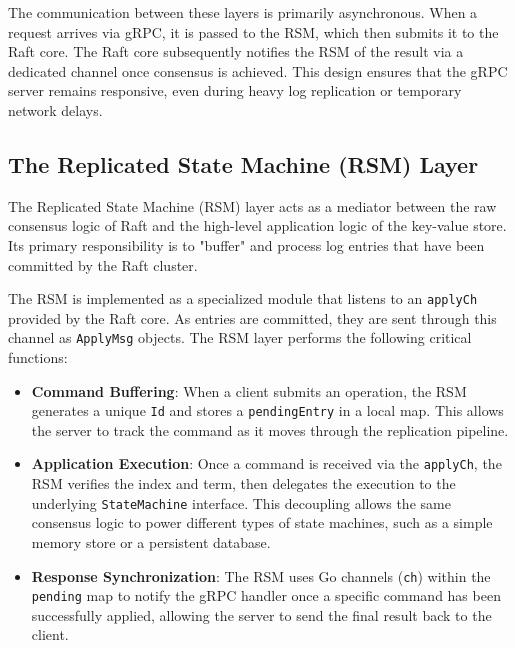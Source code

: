 The communication between these layers is primarily asynchronous.
When a request arrives via gRPC, it is passed to the RSM, which then submits it to the Raft core. The Raft core subsequently notifies the RSM of the result via a dedicated channel once consensus is achieved. This design ensures that the gRPC server remains responsive, even during heavy log replication or temporary network delays.

\subsection{The Replicated State Machine (RSM) Layer}
The Replicated State Machine (RSM) layer acts as a mediator between the raw consensus logic of Raft and the high-level application logic of the key-value store. Its primary responsibility is to "buffer" and process log entries that have been committed by the Raft cluster.

The RSM is implemented as a specialized module that listens to an \texttt{applyCh} provided by the Raft core. As entries are committed, they are sent through this channel as \texttt{ApplyMsg} objects. The RSM layer performs the following critical functions:
\begin{itemize}
    \item \textbf{Command Buffering}: When a client submits an operation, the RSM generates a unique \texttt{Id} and stores a \texttt{pendingEntry} in a local map. This allows the server to track the command as it moves through the replication pipeline.
    \item \textbf{Application Execution}: Once a command is received via the \texttt{applyCh}, the RSM verifies the index and term, then delegates the execution to the underlying \texttt{StateMachine} interface. This decoupling allows the same consensus logic to power different types of state machines, such as a simple memory store or a persistent database.
    \item \textbf{Response Synchronization}: The RSM uses Go channels (\texttt{ch}) within the \texttt{pending} map to notify the gRPC handler once a specific command has been successfully applied, allowing the server to send the final result back to the client.
\end{itemize}

